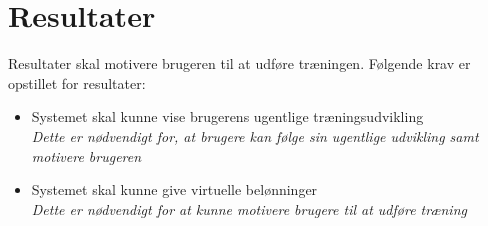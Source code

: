\section{Resultater}
Resultater skal motivere brugeren til at udføre træningen. Følgende krav er opstillet for resultater:
\begin{itemize}
\item Systemet skal kunne vise brugerens ugentlige træningsudvikling
\\
\textit{Dette er nødvendigt for, at brugere kan følge sin ugentlige udvikling samt motivere brugeren}
\item Systemet skal kunne give virtuelle belønninger
\\
\textit{Dette er nødvendigt for at kunne motivere brugere til at udføre træning}
\end{itemize}

